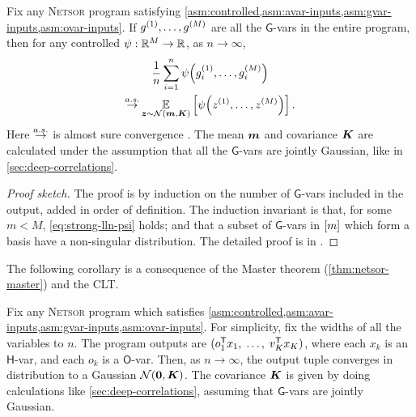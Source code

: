 \documentclass[accepted]{uai2021} %
\newcommand{\Netsor}{\textsc{Netsor}\xspace}
\newcommand{\Gva}{\mathsf{G}}
\newcommand{\Hva}{\mathsf{H}}
\newcommand{\Ova}{\mathsf{O}}
\newcommand{\chan}{i}
\newcommand{\0}{\boldsymbol{0}}
\newcommand{\1}{\boldsymbol{1}}
\begin{document}
\begin{theorem}[\Netsor master theorem, \citealp{yang2019wide}]
  Fix any \Netsor program satisfying \cref{asm:controlled,asm:avar-inputs,asm:gvar-inputs,asm:ovar-inputs}. If $g^{{\left( 1 \right)}},\dots,g^{{\left( M \right)}}$ are all the $\Gva$-vars in the entire program, then for any controlled $\psi : {\mathbb{R}}^{M} \to {\mathbb{R}}$, as $n\to\infty$,
  \begin{multline}
    \frac{1}{n}\sum_{\chan=1}^{n} \psi\bra{g\ssup{1}_{\chan},\dots,g\ssup{M}_{\chan}}\\\asconverges \Expect{\vz \sim \Normal{\vm, \mK}}{\psi\bra{z\ssup{1}, \dots, z\ssup{M}}}.
    \label{eq:strong-lln-psi}
  \end{multline}
  Here $\mathbin{\overset{a.s.}{\rightarrow}}$ is almost sure convergence \citep[sec.~5.2]{probability-theory-intro}. The mean ${\bm{m}}$ and covariance ${\bm{K}}$ are calculated under the assumption that all the $\Gva$-vars are jointly Gaussian, like in \cref{sec:deep-correlations}.
  \label{thm:netsor-master}
\end{theorem}
\begin{proof}[Proof sketch]
  The proof is by induction on the number of $\Gva$-vars included in the output,
  added in order of definition. The induction invariant is that, for some $m < M$, \cref{eq:strong-lln-psi} holds; and that a subset of $\Gva$-vars in $[m]$ which form a basis have a non-singular distribution. The detailed proof is in \citet[Appendix~H]{yang2019wide}.
\end{proof}

The following corollary is a consequence of the Master theorem
(\ref{thm:netsor-master}) and the \acl{CLT}.

\begin{corollary}
Fix any \Netsor program which satisfies \cref{asm:controlled,asm:avar-inputs,asm:gvar-inputs,asm:ovar-inputs}.
For simplicity, fix
  the widths of all the variables to $n$. The program outputs are $(o_{1}^{\mathsf{T}} x_1, \;\dots, \; v_K^{\mathsf{T}}
  x_K)$, where
  each $x_k$ is an $\Hva$-var, and each
    $o_k$ is a $\Ova$-var.
  Then, as $n \to \infty$, the output tuple
  converges in distribution to a Gaussian $\mathcal{N}{\left( {\boldsymbol{0}}, {\bm{K}} \right)}$.
  The covariance ${\bm{K}}$ is given by doing calculations like \cref{sec:deep-correlations}, assuming that $\Gva$-vars are jointly Gaussian.
  \label{corollary:netsor-gp}
\end{corollary}
\end{document}
